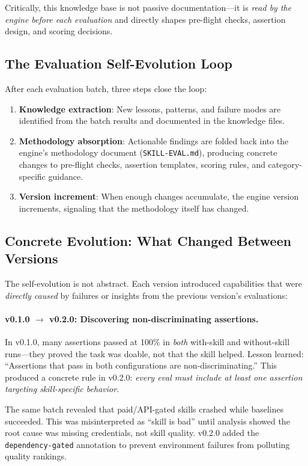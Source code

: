 \documentclass[11pt,a4paper]{article}
\begin{document}
Critically, this knowledge base is not passive documentation---it is \emph{read by the engine before each evaluation} and directly shapes pre-flight checks, assertion design, and scoring decisions.

\subsection{The Evaluation Self-Evolution Loop}

After each evaluation batch, three steps close the loop:

\begin{enumerate}[leftmargin=*]
    \item \textbf{Knowledge extraction}: New lessons, patterns, and failure modes are identified from the batch results and documented in the knowledge files.
    \item \textbf{Methodology absorption}: Actionable findings are folded back into the engine's methodology document (\texttt{SKILL-EVAL.md}), producing concrete changes to pre-flight checks, assertion templates, scoring rules, and category-specific guidance.
    \item \textbf{Version increment}: When enough changes accumulate, the engine version increments, signaling that the methodology itself has changed.
\end{enumerate}

\subsection{Concrete Evolution: What Changed Between Versions}

The self-evolution is not abstract. Each version introduced capabilities that were \emph{directly caused} by failures or insights from the previous version's evaluations:

\paragraph{v0.1.0 $\rightarrow$ v0.2.0: Discovering non-discriminating assertions.}
In v0.1.0, many assertions passed at 100\% in \emph{both} with-skill and without-skill runs---they proved the task was doable, not that the skill helped. Lesson learned: ``Assertions that pass in both configurations are non-discriminating.'' This produced a concrete rule in v0.2.0: \emph{every eval must include at least one assertion targeting skill-specific behavior.}

The same batch revealed that paid/API-gated skills crashed while baselines succeeded. This was misinterpreted as ``skill is bad'' until analysis showed the root cause was missing credentials, not skill quality. v0.2.0 added the \texttt{dependency-gated} annotation to prevent environment failures from polluting quality rankings.
\end{document}
